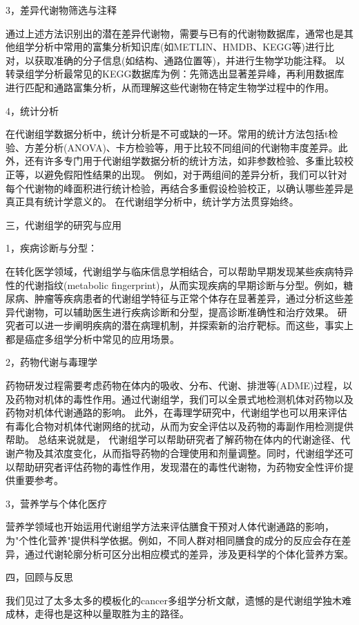 \documentclass[12pt,hyperref,a4paper,UTF8]{ctexart}
\begin{document}
3，差异代谢物筛选与注释

通过上述方法识别出的潜在差异代谢物，需要与已有的代谢物数据库，通常也是其他组学分析中常用的富集分析知识库(如METLIN、HMDB、KEGG等)进行比对，以获取准确的分子信息(如结构、通路位置等)，并进行生物学功能注释。
以转录组学分析最常见的KEGG数据库为例：先筛选出显著差异峰，再利用数据库进行匹配和通路富集分析，从而理解这些代谢物在特定生物学过程中的作用\cite{8}。

4，统计分析

在代谢组学数据分析中，统计分析是不可或缺的一环。常用的统计方法包括t检验、方差分析(ANOVA)、卡方检验等，用于比较不同组间的代谢物丰度差异。此外，还有许多专门用于代谢组学数据分析的统计方法，如非参数检验、多重比较校正等，以避免假阳性结果的出现。
例如，对于两组间的差异分析，我们可以针对每个代谢物的峰面积进行统计检验，再结合多重假设检验校正，以确认哪些差异是真正具有统计学意义的\cite{9}。
在代谢组学分析中，统计学方法贯穿始终。

三，代谢组学的研究与应用

1，疾病诊断与分型：

在转化医学领域，代谢组学与临床信息学相结合，可以帮助早期发现某些疾病特异性的代谢指纹(metabolic fingerprint)，从而实现疾病的早期诊断与分型。例如，糖尿病、肿瘤等疾病患者的代谢组学特征与正常个体存在显著差异，通过分析这些差异代谢物，可以辅助医生进行疾病诊断和分型，提高诊断准确性和治疗效果。
研究者可以进一步阐明疾病的潜在病理机制，并探索新的治疗靶标。而这些，事实上都是癌症多组学分析中常见的应用场景。

2，药物代谢与毒理学

药物研发过程需要考虑药物在体内的吸收、分布、代谢、排泄等(ADME)过程，以及药物对机体的毒性作用。通过代谢组学，我们可以全景式地检测机体对药物以及药物对机体代谢通路的影响。
此外，在毒理学研究中，代谢组学也可以用来评估有毒化合物对机体代谢网络的扰动，从而为安全评估以及药物的毒副作用检测提供帮助\cite{10}。
总结来说就是，
代谢组学可以帮助研究者了解药物在体内的代谢途径、代谢产物及其浓度变化，从而指导药物的合理使用和剂量调整。同时，代谢组学还可以帮助研究者评估药物的毒性作用，发现潜在的毒性代谢物，为药物安全性评价提供重要参考。

3，营养学与个体化医疗

营养学领域也开始运用代谢组学方法来评估膳食干预对人体代谢通路的影响，为"个性化营养"提供科学依据。例如，不同人群对相同膳食的成分的反应会存在差异，通过代谢轮廓分析可区分出相应模式的差异，涉及更科学的个体化营养方案\cite{11}。

四，回顾与反思

我们见过了太多太多的模板化的cancer多组学分析文献，遗憾的是代谢组学独木难成林，走得也是这种以量取胜为主的路径。
\end{document}
